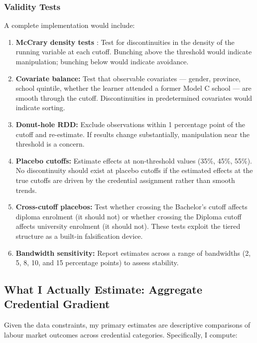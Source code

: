 \documentclass[12pt]{article}
\begin{document}
\subsubsection{Validity Tests}

A complete implementation would include:

\begin{enumerate}
    \item \textbf{McCrary density tests} \citep{mccrary2008manipulation}: Test for discontinuities in the density of the running variable at each cutoff. Bunching above the threshold would indicate manipulation; bunching below would indicate avoidance.

    \item \textbf{Covariate balance:} Test that observable covariates --- gender, province, school quintile, whether the learner attended a former Model C school --- are smooth through the cutoff. Discontinuities in predetermined covariates would indicate sorting.

    \item \textbf{Donut-hole RDD:} Exclude observations within 1 percentage point of the cutoff and re-estimate. If results change substantially, manipulation near the threshold is a concern.

    \item \textbf{Placebo cutoffs:} Estimate effects at non-threshold values (35\%, 45\%, 55\%). No discontinuity should exist at placebo cutoffs if the estimated effects at the true cutoffs are driven by the credential assignment rather than smooth trends.

    \item \textbf{Cross-cutoff placebos:} Test whether crossing the Bachelor's cutoff affects diploma enrolment (it should not) or whether crossing the Diploma cutoff affects university enrolment (it should not). These tests exploit the tiered structure as a built-in falsification device.

    \item \textbf{Bandwidth sensitivity:} Report estimates across a range of bandwidths (2, 5, 8, 10, and 15 percentage points) to assess stability.
\end{enumerate}

\subsection{What I Actually Estimate: Aggregate Credential Gradient}

Given the data constraints, my primary estimates are descriptive comparisons of labour market outcomes across credential categories. Specifically, I compute:
\end{document}
